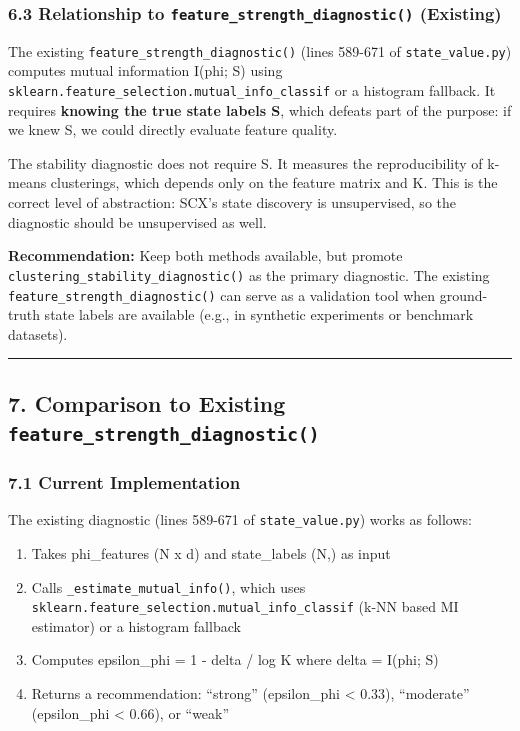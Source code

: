 \documentclass[
  12pt,
]{article}
\providecommand{\tightlist}{%
  \setlength{\itemsep}{0pt}\setlength{\parskip}{0pt}}
\begin{document}
\subsubsection{\texorpdfstring{6.3 Relationship to
\texttt{feature\_strength\_diagnostic()}
(Existing)}{6.3 Relationship to feature\_strength\_diagnostic() (Existing)}}\label{relationship-to-feature_strength_diagnostic-existing}

The existing \texttt{feature\_strength\_diagnostic()} (lines 589-671 of
\texttt{state\_value.py}) computes mutual information I(phi; S) using
\texttt{sklearn.feature\_selection.mutual\_info\_classif} or a histogram
fallback. It requires \textbf{knowing the true state labels S}, which
defeats part of the purpose: if we knew S, we could directly evaluate
feature quality.

The stability diagnostic does not require S. It measures the
reproducibility of k-means clusterings, which depends only on the
feature matrix and K. This is the correct level of abstraction: SCX's
state discovery is unsupervised, so the diagnostic should be
unsupervised as well.

\textbf{Recommendation:} Keep both methods available, but promote
\texttt{clustering\_stability\_diagnostic()} as the primary diagnostic.
The existing \texttt{feature\_strength\_diagnostic()} can serve as a
validation tool when ground-truth state labels are available (e.g., in
synthetic experiments or benchmark datasets).

\begin{center}\rule{0.5\linewidth}{0.5pt}\end{center}

\subsection{\texorpdfstring{7. Comparison to Existing
\texttt{feature\_strength\_diagnostic()}}{7. Comparison to Existing feature\_strength\_diagnostic()}}\label{comparison-to-existing-feature_strength_diagnostic}

\subsubsection{7.1 Current Implementation}\label{current-implementation}

The existing diagnostic (lines 589-671 of \texttt{state\_value.py})
works as follows:

\begin{enumerate}
\def\labelenumi{\arabic{enumi}.}
\tightlist
\item
  Takes phi\_features (N x d) and state\_labels (N,) as input
\item
  Calls \texttt{\_estimate\_mutual\_info()}, which uses
  \texttt{sklearn.feature\_selection.mutual\_info\_classif} (k-NN based
  MI estimator) or a histogram fallback
\item
  Computes epsilon\_phi = 1 - delta / log K where delta = I(phi; S)
\item
  Returns a recommendation: ``strong'' (epsilon\_phi \textless{} 0.33),
  ``moderate'' (epsilon\_phi \textless{} 0.66), or ``weak''
\end{enumerate}
\end{document}
